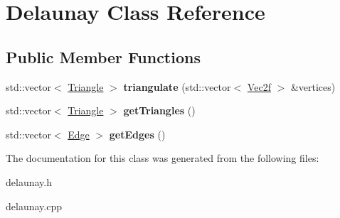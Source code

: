 \hypertarget{class_delaunay}{}\section{Delaunay Class Reference}
\label{class_delaunay}
\subsection*{Public Member Functions}
\begin{DoxyCompactItemize}
\item 
std\+::vector$<$ \hyperlink{class_triangle}{Triangle} $>$ {\bfseries triangulate} (std\+::vector$<$ \hyperlink{class_vector2}{Vec2f} $>$ \&vertices)\hypertarget{class_delaunay_a97f07ff9e702dd4592fe353805a9f82c}{}\label{class_delaunay_a97f07ff9e702dd4592fe353805a9f82c}

\item 
std\+::vector$<$ \hyperlink{class_triangle}{Triangle} $>$ {\bfseries get\+Triangles} ()\hypertarget{class_delaunay_a15d2799c1fa1b237e4f0afad610517c2}{}\label{class_delaunay_a15d2799c1fa1b237e4f0afad610517c2}

\item 
std\+::vector$<$ \hyperlink{class_edge}{Edge} $>$ {\bfseries get\+Edges} ()\hypertarget{class_delaunay_a8ca53e3d46f367fc879de1905d8bbf3b}{}\label{class_delaunay_a8ca53e3d46f367fc879de1905d8bbf3b}

\end{DoxyCompactItemize}


The documentation for this class was generated from the following files\+:\begin{DoxyCompactItemize}
\item 
delaunay.\+h\item 
delaunay.\+cpp\end{DoxyCompactItemize}

